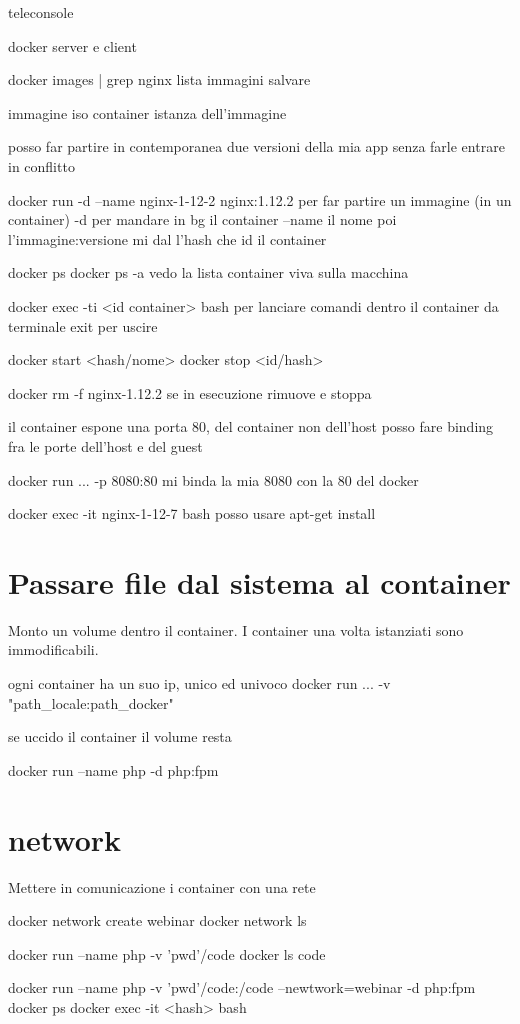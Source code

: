 teleconsole

docker server e client

docker images | grep nginx 	
lista immagini salvare

immagine iso
container istanza dell'immagine

posso far partire in contemporanea due versioni della mia app senza farle entrare in conflitto

docker run -d --name nginx-1-12-2 nginx:1.12.2 
per far partire un immagine (in un container) 
-d per mandare in bg il container
--name il nome 
poi l'immagine:versione
mi dal l'hash che id il container 

docker ps 
docker ps -a
vedo la lista container viva sulla macchina 

docker exec -ti <id container> bash
per lanciare comandi dentro il container da terminale
exit per uscire

docker start <hash/nome>
docker stop <id/hash>

docker rm -f nginx-1.12.2
se in esecuzione rimuove e stoppa

il container espone una porta 80, del container non dell'host
posso fare binding fra le porte dell'host e del guest 

docker run ... -p 8080:80 mi binda la mia 8080 con la 80 del docker

docker exec -it nginx-1-12-7 bash
posso usare apt-get install 

\section{Passare file dal sistema al container}
Monto un volume dentro il container.
I container una volta istanziati sono immodificabili.

ogni container ha un suo ip, unico ed univoco
docker run ... -v "path_locale:path_docker"

se uccido il container il volume resta

docker run --name php -d php:fpm 

\section{network}
Mettere in comunicazione i container con una rete

docker network create webinar
docker network ls

docker run --name php -v 'pwd'/code
docker ls code 

docker run --name php -v 'pwd'/code:/code --newtwork=webinar -d php:fpm
docker ps
docker exec -it <hash> bash

